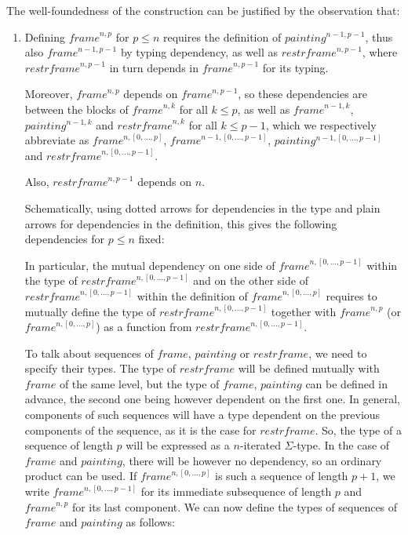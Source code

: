 \documentclass[a4paper,english,cleveref,autoref,thm-restate]{article}
\newcommand{\myframe}{\mathit{frame}}
\newcommand{\painting}{\mathit{painting}}
\newcommand{\restrframe}{\mathit{restrframe}}
\begin{document}
The well-foundedness of the construction can be justified by the observation that:
\begin{enumerate}
\item Defining $\myframe^{n,p}$ for $p \leq n$ requires the definition
  of $\painting^{n-1,p-1}$, thus also $\myframe^{n-1,p-1}$ by typing
  dependency, as well as $\restrframe^{n,p-1}$, where
  $\restrframe^{n,p-1}$ in turn depends in $\myframe^{n,p-1}$ for its
  typing.

  Moreover, $\myframe^{n,p}$ depends on $\myframe^{n,p-1}$, so these
  dependencies are between the blocks of $\myframe^{n,k}$ for all
  $k\leq p$, as well as $\myframe^{n-1,k}$, $\painting^{n-1,k}$ and
  $\restrframe^{n,k}$ for all $k\leq p-1$, which we respectively
  abbreviate as $\myframe^{n,[0,...,p]}$,
  $\myframe^{n-1,[0,...,p-1]}$, $\painting^{n-1,[0,...,p-1]}$ and
  $\restrframe^{n,[0,...,p-1]}$.

  Also, $\restrframe^{n,p-1}$ depends on $n$.

  Schematically, using dotted arrows for dependencies in
  the type and plain arrows for dependencies in the definition, this
  gives the following dependencies for $p\leq n$ fixed:
\begin{center}
\end{center}

In particular, the mutual dependency on one side of
$\myframe^{n,[0,...,p-1]}$ within the type of
$\restrframe^{n,[0,...,p-1]}$ and on the other side of
$\restrframe^{n,[0,...,p-1]}$ within the definition of
$\myframe^{n,[0,...,p]}$ requires to mutually define the type of
$\restrframe^{n,[0,...,p-1]}$ together with $\myframe^{n,p}$ (or
$\myframe^{n,[0,...,p]}$) as a function from
$\restrframe^{n,[0,...,p-1]}$.

To talk about sequences of $\myframe$, $\painting$ or $\restrframe$,
we need to specify their types. The type of $\restrframe$ will be
defined mutually with $\myframe$ of the same level, but the type of
$\myframe$, $\painting$ can be defined in advance, the second one
being however dependent on the first one. In general, components of
such sequences will have a type dependent on the previous components
of the sequence, as it is the case for $\restrframe$. So, the type of
a sequence of length $p$ will be expressed as a $n$-iterated
$\Sigma$-type. In the case of $\myframe$ and $\painting$, there will
be however no dependency, so an ordinary product can be used. If
$\myframe^{n,[0,...,p]}$ is such a sequence of length $p+1$, we write
$\myframe^{n,[0,...,p-1]}$ for its immediate subsequence of length $p$
and $\myframe^{n,p}$ for its last component. We can now define the
types of sequences of $\myframe$ and $\painting$ as follows:


\end{enumerate}
\end{document}
